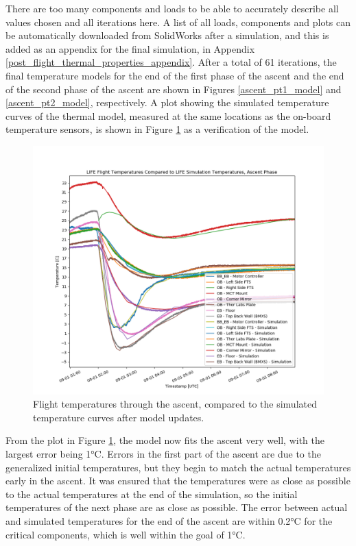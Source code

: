 There are too many components and loads to be able to accurately describe all values chosen and all iterations here. A list of all loads, components and plots can be automatically downloaded from SolidWorks after a simulation, and this is added as an appendix for the final simulation, in Appendix \ref{post_flight_thermal_properties_appendix}. After a total of 61 iterations, the final temperature models for the end of the first phase of the ascent and the end of the second phase of the ascent are shown in Figures \ref{ascent_pt1_model} and \ref{ascent_pt2_model}, respectively. A plot showing the simulated temperature curves of the thermal model, measured at the same locations as the on-board temperature sensors, is shown in Figure \ref{fig:ascent_temps_with_sims} as a verification of the model.

\begin{figure}
    \centering
    \includegraphics[width=\textwidth]{chap4_images/ascent_images/ascent_with_sim_temps_no_altitude.png}
    \caption{Flight temperatures through the ascent, compared to the simulated temperature curves after model updates.}
    \label{fig:ascent_temps_with_sims}
\end{figure}

From the plot in Figure \ref{fig:ascent_temps_with_sims}, the model now fits the ascent very well, with the largest error being 1°C. Errors in the first part of the ascent are due to the generalized initial temperatures, but they begin to match the actual temperatures early in the ascent. It was ensured that the temperatures were as close as possible to the actual temperatures at the end of the simulation, so the initial temperatures of the next phase are as close as possible. The error between actual and simulated temperatures for the end of the ascent are within 0.2°C for the critical components, which is well within the goal of 1°C.

